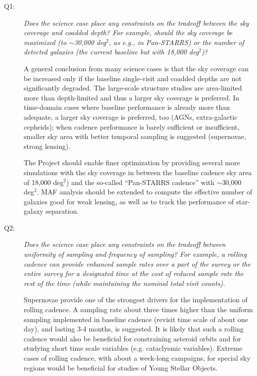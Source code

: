 \begin{description}

\item[Q1:] {\it Does the science case place any constraints on the
tradeoff between the sky coverage and coadded depth? For example, should
the sky coverage be maximized (to $\sim$30,000 deg$^2$, as e.g., in
Pan-STARRS) or the number of detected galaxies (the current baseline but
with 18,000 deg$^2$)?}

A general conclusion from many science cases is that the sky coverage
can be increased only if the baseline single-visit and coadded depths
are not significantly degraded. The large-scale structure studies are 
area-limited more than depth-limited and thus a larger sky coverage is 
preferred. In time-domain cases where baseline performance is already 
more than adequate, a larger sky coverage is preferred, too (AGNs, 
extra-galactic cepheids); when cadence performance is barely sufficient 
or insufficient, smaller sky area with better temporal sampling is suggested 
(supernovae, strong lensing). 

The Project should enable finer optimization by providing several more
simulations with the sky coverage in between the baseline cadence sky
area of 18,000 deg$^2$) and the so-called ``Pan-STARRS cadence'' with
$\sim$30,000 deg$^2$. MAF analysis should be extended to compute the
effective number of galaxies good for weak lensing, as well as to track
the performance of star-galaxy separation.


\item[Q2:] {\it Does the science case place any constraints on the
tradeoff between uniformity of sampling and frequency of  sampling? For
example, a rolling cadence can provide enhanced sample rates over a part
of the survey or the entire survey for a designated time at the cost of
reduced sample rate the rest of the time (while maintaining the nominal
total visit counts).}

Supernovae provide one of the strongest drivers for the implementation of
rolling cadence. A sampling rate about three times higher than the
uniform sampling implemented in baseline cadence (revisit time scale of
about one day), and lasting 3-4 months, is suggested. It is likely that
such a rolling cadence would also be beneficial for constraining
asteroid orbits and for studying short time scale variables (e.g.
cataclysmic variables). Extreme cases of rolling cadence, with about a
week-long campaigns, for special sky regions would be beneficial for
studies of Young Stellar Objects.


\end{description}
